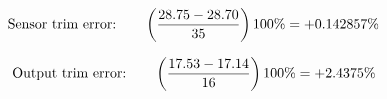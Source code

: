 












$$\hbox{Sensor trim error:} \hskip 20pt \left({28.75 - 28.70 \over 35}\right) 100\% = +0.142857\%$$

$$\hbox{Output trim error:} \hskip 20pt \left({17.53 - 17.14 \over 16}\right) 100\% = +2.4375\%$$




